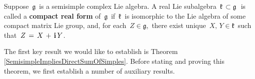 
\begin{definition}
\mbox{}
\vskip 0.1cm
\noindent
Suppose \,$\mathfrak{g}$\, is a semisimple complex Lie algebra.
A real Lie subalgebra \,$\mathfrak{k} \,\subset \mathfrak{g}\,$\,
is called a \textbf{compact real form} of \,$\mathfrak{g}$\, if
\,$\mathfrak{k}$\, is isomorphic to the Lie algebra of some
{\color{red}compact} matrix Lie group, and, for each \,$Z \in \mathfrak{g}$,\,
there exist unique \,$X,\, Y \in \mathfrak{k}$\, such that
\,$Z \,=\, X \,+\, \mathbf{i}\,Y$.\,
\end{definition}


The first key result we would like to establish is Theorem \ref{SemisimpleImpliesDirectSumOfSimples}.
Before stating and proving this theorem, we first establish a number of auxiliary results.


